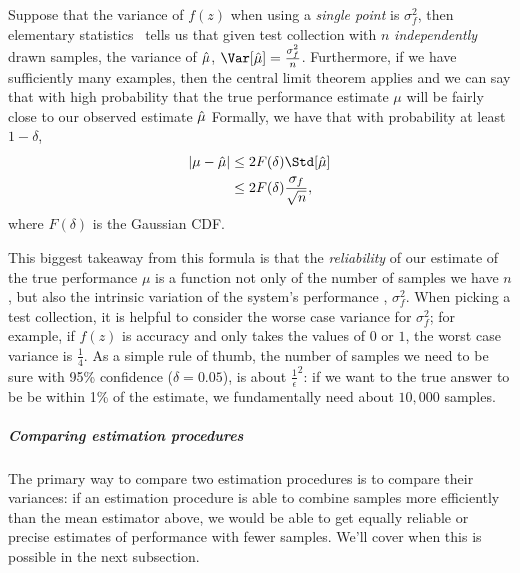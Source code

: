 Suppose that the variance of $f(z)$ when using a \textit{single point} is $\sigma^2_f$, then
elementary statistics~\citep{casella1990statistical} tells us that given test collection with $n$ \textit{independently} drawn samples, the variance of $\hat{\mu}$, $\Var[\muh] = \frac{\sigma^2_f}{n}$.
Furthermore, if we have sufficiently many examples, then the central limit theorem applies and we can say that with high probability that the true performance estimate $\mu$ will be fairly close to our observed estimate $\hat{\mu}$
Formally, we have that with probability at least $1 - \delta$,
\begin{align*}
  |\mu - \muh| &\le 2F(\delta) \Std[\muh] \\
  &\le 2F(\delta) \frac{\sigma_f}{\sqrt{n}},
\end{align*}
where $F(\delta)$ is the Gaussian CDF.\@
{}

This biggest takeaway from this formula is that the \textit{reliability} of our estimate of the true performance $\mu$ is a function not only of the number of samples we have $n$, but also the intrinsic variation of the system's performance , $\sigma^2_f$.
When picking a test collection, it is helpful to consider the worse case variance for $\sigma^2_f$; for example, if $f(z)$ is accuracy and only takes the values of $0$ or $1$, the worst case variance is $\frac{1}{4}$.
As a simple rule of thumb, the number of samples we need to be sure with 95\% confidence ($\delta = 0.05$), is about $\frac{1}{\epsilon}^2$: if we want to the true answer to be be within 1\% of the estimate, we fundamentally need about $10,000$ samples.

\subparagraph{Comparing estimation procedures}
The primary way to compare two estimation procedures  is to compare their variances: if an estimation procedure is able to combine samples more efficiently than the mean estimator above, we would be able to get equally reliable or precise estimates of performance with fewer samples.
We'll cover when this is possible in the next subsection.

